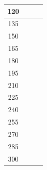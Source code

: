 \documentclass[twocolumn,a4j]{jsarticle}
\begin{document}
\begin{table}[htbp]
\begin{center}
\begin{tabular}{|p{20mm}|p{20mm}|p{20mm}|p{20mm}|}
            \multicolumn{1}{|c|}{120}                   & \multicolumn{1}{|c|}{}              & \multicolumn{1}{|c|}{\textgt{}}    & \multicolumn{1}{|c|}{\textgt{}}\\ \hline
            \multicolumn{1}{|c|}{135}                   & \multicolumn{1}{|c|}{}              & \multicolumn{1}{|c|}{\textgt{}}    & \multicolumn{1}{|c|}{\textgt{}}\\ \hline
            \multicolumn{1}{|c|}{150}                   & \multicolumn{1}{|c|}{}              & \multicolumn{1}{|c|}{\textgt{}}    & \multicolumn{1}{|c|}{\textgt{}}\\ \hline
            \multicolumn{1}{|c|}{165}                   & \multicolumn{1}{|c|}{}              & \multicolumn{1}{|c|}{\textgt{}}    & \multicolumn{1}{|c|}{\textgt{}}\\ \hline
            \multicolumn{1}{|c|}{180}                   & \multicolumn{1}{|c|}{}              & \multicolumn{1}{|c|}{\textgt{}}    & \multicolumn{1}{|c|}{\textgt{}}\\ \hline
            \multicolumn{1}{|c|}{195}                   & \multicolumn{1}{|c|}{}              & \multicolumn{1}{|c|}{\textgt{}}    & \multicolumn{1}{|c|}{\textgt{}}\\ \hline
            \multicolumn{1}{|c|}{210}                   & \multicolumn{1}{|c|}{}              & \multicolumn{1}{|c|}{\textgt{}}    & \multicolumn{1}{|c|}{\textgt{}}\\ \hline
            \multicolumn{1}{|c|}{225}                   & \multicolumn{1}{|c|}{}              & \multicolumn{1}{|c|}{\textgt{}}    & \multicolumn{1}{|c|}{\textgt{}}\\ \hline
            \multicolumn{1}{|c|}{240}                   & \multicolumn{1}{|c|}{}              & \multicolumn{1}{|c|}{\textgt{}}    & \multicolumn{1}{|c|}{\textgt{}}\\ \hline
            \multicolumn{1}{|c|}{255}                   & \multicolumn{1}{|c|}{}              & \multicolumn{1}{|c|}{\textgt{}}    & \multicolumn{1}{|c|}{\textgt{}}\\ \hline
            \multicolumn{1}{|c|}{270}                   & \multicolumn{1}{|c|}{}              & \multicolumn{1}{|c|}{\textgt{}}    & \multicolumn{1}{|c|}{\textgt{}}\\ \hline
            \multicolumn{1}{|c|}{285}                   & \multicolumn{1}{|c|}{}              & \multicolumn{1}{|c|}{\textgt{}}    & \multicolumn{1}{|c|}{\textgt{}}\\ \hline
            \multicolumn{1}{|c|}{300}                   & \multicolumn{1}{|c|}{}              & \multicolumn{1}{|c|}{\textgt{}}    & \multicolumn{1}{|c|}{\textgt{}}\\ \hline

\end{tabular}
\end{center}
\end{table}
\end{document}
